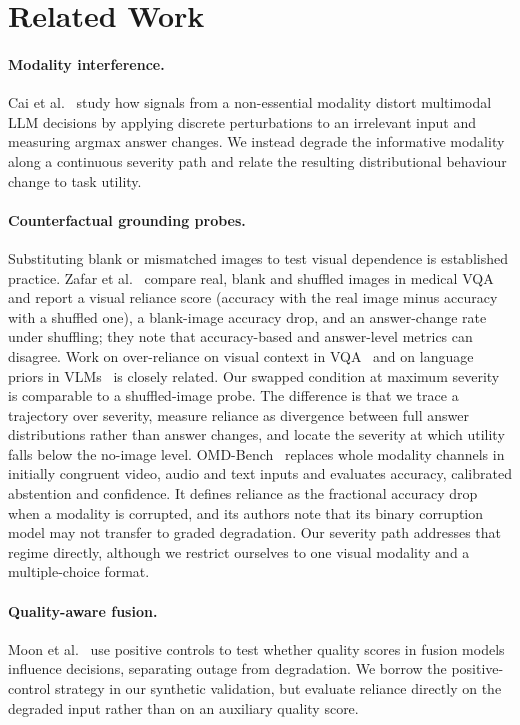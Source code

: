\section{Related Work}
\label{sec:related}

\paragraph{Modality interference.}
Cai et al.~\cite{cai2025interference} study how signals from a
non-essential modality distort multimodal LLM decisions by applying discrete
perturbations to an irrelevant input and measuring argmax answer changes.
We instead degrade the informative modality along a continuous severity path
and relate the resulting distributional behaviour change to task utility.

\paragraph{Counterfactual grounding probes.}
Substituting blank or mismatched images to test visual dependence is
established practice. Zafar et al.~\cite{zafar2026grounding} compare real,
blank and shuffled images in medical VQA and report a visual reliance
score (accuracy with the real image minus accuracy with a shuffled one),
a blank-image accuracy drop, and an answer-change rate under shuffling;
they note that accuracy-based and answer-level metrics can disagree. Work
on over-reliance on visual context in VQA~\cite{gupta2022swapmix}
and on language priors in VLMs~\cite{goyal2017making,agrawal2018dont} is
closely related. Our swapped
condition at maximum severity is comparable to a shuffled-image probe. The
difference is that we trace a trajectory over severity, measure reliance
as divergence between full answer distributions rather than answer
changes, and locate the severity at which utility falls below the
no-image level.
OMD-Bench~\cite{nazi2026omd} replaces whole modality channels in
initially congruent video, audio and text inputs and evaluates
accuracy, calibrated abstention and confidence. It defines reliance as the
fractional accuracy drop when a modality is corrupted, and its authors
note that its binary corruption model may not transfer to graded
degradation. Our severity path addresses that regime directly, although
we restrict ourselves to one visual modality and a multiple-choice
format.

\paragraph{Quality-aware fusion.}
Moon et al.~\cite{moon2026quality} use positive controls to test whether
quality scores in fusion models influence decisions, separating outage from
degradation. We borrow the positive-control strategy in our synthetic
validation, but evaluate reliance directly on the degraded input rather than on
an auxiliary quality score.

